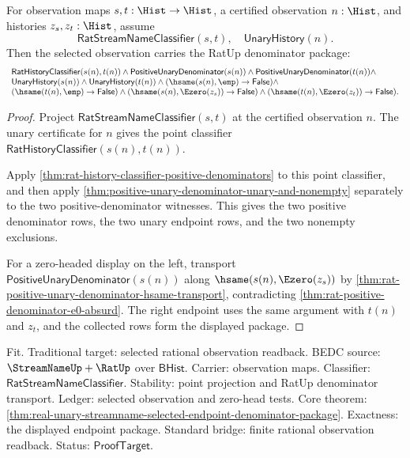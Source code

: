 \begin{theorem}
\label{thm:real-unary-streamname-selected-endpoint-denominator-package}
For observation maps $s,t:\Hist\to\Hist$, a certified observation $n:\Hist$,
and histories $z_s,z_t:\Hist$, assume
$$
\mathsf{RatStreamNameClassifier}(s,t),\quad \mathsf{UnaryHistory}(n).
$$
Then the selected observation carries the RatUp denominator package:
$$
\begin{array}{l}
\mathsf{RatHistoryClassifier}(s(n),t(n))\land
\mathsf{PositiveUnaryDenominator}(s(n))\land
\mathsf{PositiveUnaryDenominator}(t(n))\land\\
\mathsf{UnaryHistory}(s(n))\land
\mathsf{UnaryHistory}(t(n))\land
(\hsame(s(n),\emp)\to\mathsf{False})\land\\
(\hsame(t(n),\emp)\to\mathsf{False})\land
(\hsame(s(n),\Ezero(z_s))\to\mathsf{False})\land
(\hsame(t(n),\Ezero(z_t))\to\mathsf{False}).
\end{array}
$$
\end{theorem}
\begin{proof}
Project $\mathsf{RatStreamNameClassifier}(s,t)$ at the certified observation
$n$. The unary certificate for $n$ gives the point classifier
$\mathsf{RatHistoryClassifier}(s(n),t(n))$.

Apply \autoref{thm:rat-history-classifier-positive-denominators} to this point
classifier, and then apply
\autoref{thm:positive-unary-denominator-unary-and-nonempty} separately to the
two positive-denominator witnesses. This gives the two positive denominator
rows, the two unary endpoint rows, and the two nonempty exclusions.

For a zero-headed display on the left, transport
$\mathsf{PositiveUnaryDenominator}(s(n))$ along
$\hsame(s(n),\Ezero(z_s))$ by
\autoref{thm:rat-positive-unary-denominator-hsame-transport}, contradicting
\autoref{thm:rat-positive-denominator-e0-absurd}. The right endpoint uses the
same argument with $t(n)$ and $z_t$, and the collected rows form the displayed
package.
\end{proof}

Fit. Traditional target: selected rational observation readback. BEDC source:
$\StreamNameUp+\RatUp$ over $\mathsf{BHist}$. Carrier: observation maps.
Classifier: $\mathsf{RatStreamNameClassifier}$. Stability: point projection and
RatUp denominator transport. Ledger: selected observation and zero-head tests.
Core theorem:
\autoref{thm:real-unary-streamname-selected-endpoint-denominator-package}.
Exactness: the displayed endpoint package. Standard bridge: finite rational
observation readback. Status: $\mathsf{ProofTarget}$.

